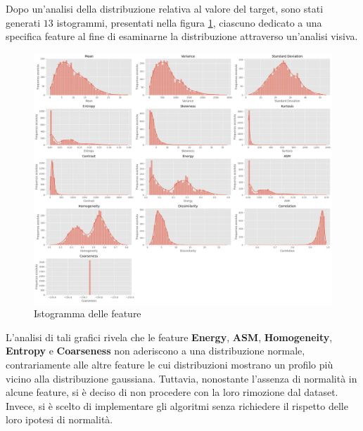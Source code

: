 Dopo un'analisi della distribuzione relativa al valore del target, sono stati
generati $13$ istogrammi, presentati nella figura \ref{fig:barplot_feature},
ciascuno dedicato a una specifica feature al fine di esaminarne la distribuzione
attraverso un'analisi visiva.
\begin{figure}[!ht]
      \centering
      \includegraphics[width=\textwidth]{img/analisi/barplot.png}
      \caption{Istogramma delle feature}
      \label{fig:barplot_feature}
\end{figure}
L'analisi di tali grafici rivela che le feature \textbf{Energy}, \textbf{ASM},
\textbf{Homogeneity}, \textbf{Entropy} e \textbf{Coarseness} non aderiscono a
una distribuzione normale, contrariamente alle altre feature le cui distribuzioni
mostrano un profilo più vicino alla distribuzione gaussiana. Tuttavia, nonostante
l'assenza di normalità in alcune feature, si è deciso di non procedere con la
loro rimozione dal dataset. Invece, si è scelto di implementare gli algoritmi senza
richiedere il rispetto delle loro ipotesi di normalità.

